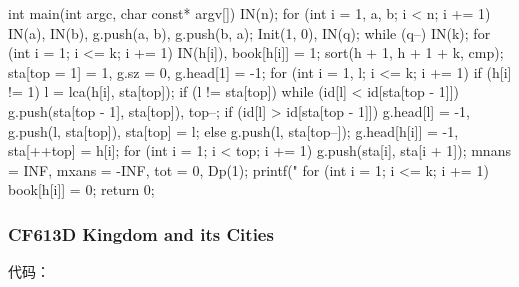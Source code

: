 \begin{cppcode}
int main(int argc, char const* argv[]) {
  IN(n);
  for (int i = 1, a, b; i < n; i += 1) IN(a), IN(b), g.push(a, b), g.push(b, a);
  Init(1, 0), IN(q);
  while (q--) {
    IN(k);
    for (int i = 1; i <= k; i += 1) IN(h[i]), book[h[i]] = 1;
    sort(h + 1, h + 1 + k, cmp);
    sta[top = 1] = 1, g.sz = 0, g.head[1] = -1;
    for (int i = 1, l; i <= k; i += 1)
      if (h[i] != 1) {
        l = lca(h[i], sta[top]);
        if (l != sta[top]) {
          while (id[l] < id[sta[top - 1]])
            g.push(sta[top - 1], sta[top]), top--;
          if (id[l] > id[sta[top - 1]])
            g.head[l] = -1, g.push(l, sta[top]), sta[top] = l;
          else
            g.push(l, sta[top--]);
        }
        g.head[h[i]] = -1, sta[++top] = h[i];
      }
    for (int i = 1; i < top; i += 1) g.push(sta[i], sta[i + 1]);
    mnans = INF, mxans = -INF, tot = 0, Dp(1);
    printf("%
    for (int i = 1; i <= k; i += 1) book[h[i]] = 0;
  }
  return 0;
}
\end{cppcode}

\subsubsection{CF613D Kingdom and its Cities}

代码：


